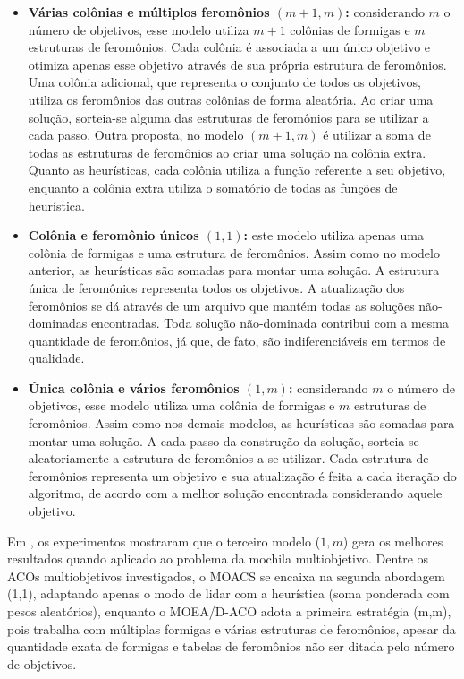 \begin{itemize}
	\item \textbf{Várias colônias e múltiplos feromônios $(m+1, m)$:} considerando $m$ o número de objetivos, esse modelo utiliza $m + 1$ colônias de formigas e $m$ estruturas de feromônios. Cada colônia é associada a um único objetivo e otimiza apenas esse objetivo através de sua própria estrutura de feromônios. Uma colônia adicional, que representa o conjunto de todos os objetivos, utiliza os feromônios das outras colônias de forma aleatória. Ao criar uma solução, sorteia-se alguma das estruturas de feromônios para se utilizar a cada passo. Outra proposta, no modelo $(m+1, m)$ é utilizar a soma de todas as estruturas de feromônios ao criar uma solução na colônia extra. Quanto as heurísticas, cada colônia utiliza a função referente a seu objetivo, enquanto a colônia extra utiliza o somatório de todas as funções de heurística.
	\item \textbf{Colônia e feromônio únicos $(1,1)$:} este modelo utiliza apenas uma colônia de formigas e uma estrutura de feromônios. Assim como no modelo anterior, as heurísticas são somadas para montar uma solução. A estrutura única de feromônios representa todos os objetivos. A atualização dos feromônios se dá através de um arquivo que mantém todas as soluções não-dominadas encontradas. Toda solução não-dominada contribui com a mesma quantidade de feromônios, já que, de fato, são indiferenciáveis em termos de qualidade.
	\item \textbf{Única colônia e vários feromônios $(1,m)$:} considerando $m$ o número de objetivos, esse modelo utiliza uma colônia de formigas e $m$ estruturas de feromônios. Assim como nos demais modelos, as heurísticas são somadas para montar uma solução. A cada passo da construção da solução, sorteia-se aleatoriamente a estrutura de feromônios a se utilizar. Cada estrutura de feromônios representa um objetivo e sua atualização é feita a cada iteração do algoritmo, de acordo com a melhor solução encontrada considerando aquele objetivo.
\end{itemize}

Em \cite{Alaya2007}, os experimentos mostraram que o terceiro modelo ($1,m$) gera os melhores resultados quando aplicado ao problema da mochila multiobjetivo. Dentre os ACOs multiobjetivos investigados, o MOACS se encaixa na segunda abordagem (1,1), adaptando apenas o modo de lidar com a heurística (soma ponderada com pesos aleatórios), enquanto o MOEA/D-ACO adota a primeira estratégia (m,m), pois trabalha com múltiplas formigas e várias estruturas de feromônios, apesar da quantidade exata de formigas e tabelas de feromônios não ser ditada pelo número de objetivos.

